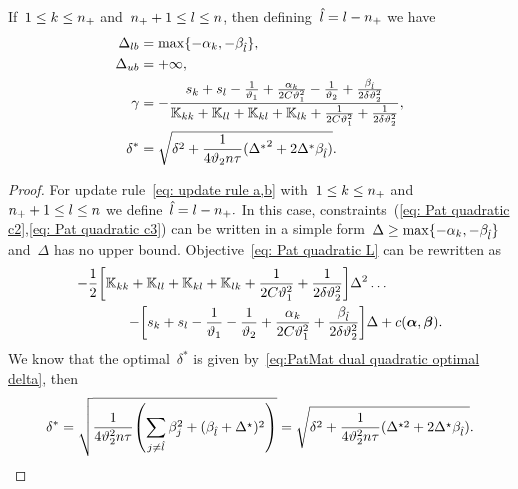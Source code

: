 \begin{lemma}
  If~$1 \le k \le n_{+}$ and~$n_{+} + 1 \le l \le n$, then defining~$\hat{l} = l - n_{+}$ we have
  \begin{align*}
    \Delta_{lb} & = \max\{- \alpha_k, - \beta_{\hat{l}}\}, \\
    \Delta_{ub} & = +\infty, \\
    \gamma      & = -\frac{s_k + s_l  - \frac{1}{\vartheta_1} + \frac{\alpha_k}{2C\vartheta_1^2} - \frac{1}{\vartheta_2} + \frac{\beta_{\hat{l}}}{2\delta\vartheta_2^2}}{\mathbb{K}_{kk} + \mathbb{K}_{ll} + \mathbb{K}_{kl} + \mathbb{K}_{lk} + \frac{1}{2C\vartheta_1^2} + \frac{1}{2\delta\vartheta_2^2}}, \\
    \delta^{*}  & = \sqrt{\delta^2 + \frac{1}{4 \vartheta_2 n \tau}({\Delta^{*}}^2 + 2 \Delta^{*} \beta_{\hat{l}})}.
  \end{align*}
\end{lemma}

\begin{proof}
  For update rule~\eqref{eq: update rule a,b} with~$1 \le k \le n_{+}$ and~$n_{+} + 1 \le l \le n$ we define~$\hat{l} = l - n_{+}.$ In this case, constraints~(\ref{eq: Pat quadratic c2},\ref{eq: Pat quadratic c3}) can be written in a simple form~$\Delta \geq \max \{- \alpha_k, - \beta_{\hat{l}}\}$ and~$\Delta$ has no upper bound. Objective~\eqref{eq: Pat quadratic L} can be rewritten as
  \begin{equation*}
    \begin{split}
      - \frac{1}{2} \Brac[s]{\K_{kk} + \K_{ll} + \K_{kl} + \K_{lk} + \frac{1}{2C\vartheta_1^2} + \frac{1}{2\delta\vartheta_2^2}} \Delta^2 \dots \qquad\qquad \\ 
      - \Brac[s]{s_k + s_l - \frac{1}{\vartheta_1} - \frac{1}{\vartheta_2} + \frac{\alphak}{2C\vartheta_1^2} + \frac{\betal}{2\delta\vartheta_2^2}} \Delta + c(\bm{\alpha}, \bm{\beta}).
    \end{split}
  \end{equation*}
  We know that the optimal~$\delta^*$ is given by~\eqref{eq:PatMat dual quadratic optimal delta}, then
  \begin{equation*}
    \delta^*
    = \sqrt{\frac{1}{4\vartheta_2^2 n \tau} \Brac{\sum_{j\neq \hat{l}} \beta_j^2 + (\betal + \Delta^\star)^2}}
    = \sqrt{\delta^2 + \frac{1}{4\vartheta_2^2 n \tau} (\Delta^{\star2} + 2\Delta^\star \betal)}.
  \end{equation*}
\end{proof}

